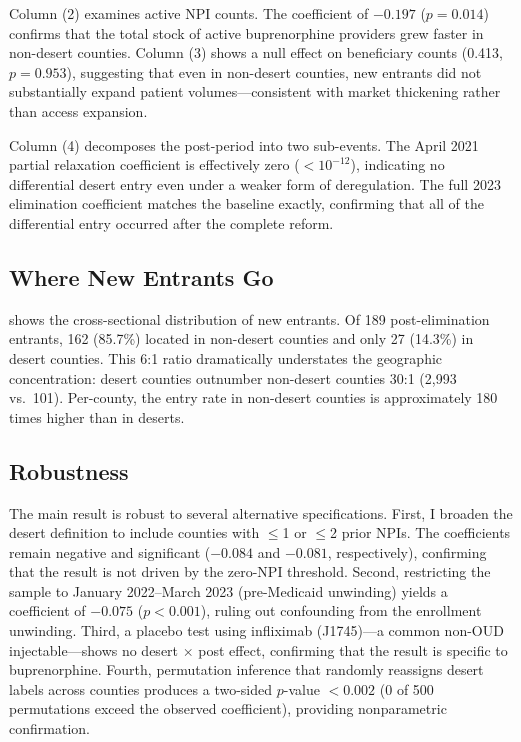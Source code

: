 \documentclass[12pt]{article}
\begin{document}
Column (2) examines active NPI counts. The coefficient of $-0.197$ ($p = 0.014$) confirms that the total stock of active buprenorphine providers grew faster in non-desert counties. Column (3) shows a null effect on beneficiary counts (0.413, $p = 0.953$), suggesting that even in non-desert counties, new entrants did not substantially expand patient volumes---consistent with market thickening rather than access expansion.

Column (4) decomposes the post-period into two sub-events. The April 2021 partial relaxation coefficient is effectively zero ($< 10^{-12}$), indicating no differential desert entry even under a weaker form of deregulation. The full 2023 elimination coefficient matches the baseline exactly, confirming that all of the differential entry occurred after the complete reform.

\subsection{Where New Entrants Go}



 shows the cross-sectional distribution of new entrants. Of 189 post-elimination entrants, 162 (85.7\%) located in non-desert counties and only 27 (14.3\%) in desert counties. This 6:1 ratio dramatically understates the geographic concentration: desert counties outnumber non-desert counties 30:1 (2,993 vs.\ 101). Per-county, the entry rate in non-desert counties is approximately 180 times higher than in deserts.

\subsection{Robustness}

The main result is robust to several alternative specifications. First, I broaden the desert definition to include counties with $\leq$1 or $\leq$2 prior NPIs. The coefficients remain negative and significant ($-0.084$ and $-0.081$, respectively), confirming that the result is not driven by the zero-NPI threshold. Second, restricting the sample to January 2022--March 2023 (pre-Medicaid unwinding) yields a coefficient of $-0.075$ ($p < 0.001$), ruling out confounding from the enrollment unwinding. Third, a placebo test using infliximab (J1745)---a common non-OUD injectable---shows no desert $\times$ post effect, confirming that the result is specific to buprenorphine. Fourth, permutation inference that randomly reassigns desert labels across counties produces a two-sided $p$-value $< 0.002$ (0 of 500 permutations exceed the observed coefficient), providing nonparametric confirmation.
\end{document}

